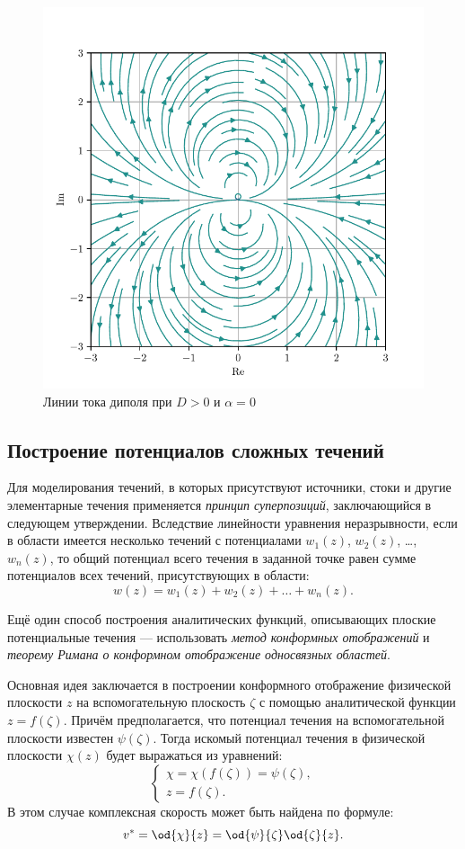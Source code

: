 \documentclass[a4paper, 14pt]{extarticle}
\begin{document}
\begin{problems}
\begin{figure}
	\centering
	\includegraphics[width=0.45\linewidth]{../img/dipol.pdf}
	\caption{Линии тока диполя при $D>0$ и $\alpha = 0$}
	\label{fig:dipol}
\end{figure}
\end{problems}

\subsection{Построение потенциалов сложных течений}

Для моделирования течений, в которых присутствуют источники, стоки и другие элементарные течения применяется \textit{принцип суперпозиций}, заключающийся в следующем утверждении. Вследствие линейности уравнения неразрывности, если в области имеется несколько течений с потенциалами $w_1(z)$, $w_2(z)$, \ldots , $w_n(z)$, то общий потенциал всего течения в заданной точке равен сумме потенциалов всех течений, присутствующих в области:
\[
w(z) = w_1(z) + w_2(z) + \ldots + w_n(z).
\] 


Ещё один способ построения аналитических функций, описывающих плоские потенциальные течения ---  использовать \textit{метод конформных отображений} и \textit{теорему Римана о конформном отображение односвязных областей}. 

Основная идея заключается в построении конформного отображение физической плоскости $z$  на вспомогательную плоскость $\zeta$  с помощью аналитической функции $z=f(\zeta)$. Причём предполагается, что потенциал течения на вспомогательной плоскости известен $\psi(\zeta)$. Тогда искомый потенциал течения в физической плоскости  $\chi(z)$ будет выражаться из уравнений:
\[
\left\{
\begin{array}{l}
	\chi = \chi(f(\zeta)) = \psi(\zeta),\\
	z = f(\zeta).
\end{array}
\right.
\]
В этом случае комплексная скорость может быть найдена по формуле:
\[
v^* = \od{\chi}{z} = \od{\psi}{\zeta}  \od{\zeta}{z}.
\]
\end{document}
